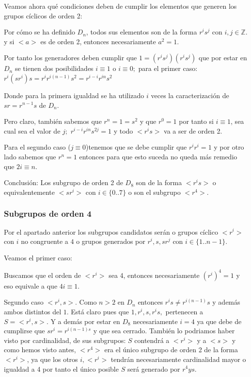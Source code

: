\documentclass[12pt]{article}
\begin{document}
Veamos ahora qué condiciones deben de cumplir los elementos que generen los grupos cíclicos de orden 2: 

Por cómo se ha definido $D_n$, todos sus elementos son de la forma $r^is^j$ con $i,j \in \mathbb Z.$ 
y si $<a>$ es de orden 2, entonces necesariamente $a^2 = 1.$

Por tanto los generadores deben cumplir que $1 = (r^is^j)(r^is^j)$  que por estar en $D_n$ se tienen dos posibilidades 
$i \equiv 1$ o $i \equiv 0;$ para el primer caso:
$r^i(sr^i)s= r^i r^{i(n-1)} s^{2} = r^{i-i} r^{in} s^{2}$

Donde para la primera igualdad se ha utilizado $i$ veces la caracterización de $sr = r^{n-1}s$ de $D_n$.

Pero claro, también sabemos que $r^n = 1 = s^2$ y que $r^0 = 1$ por tanto si $i \equiv 1$, sea cual sea el valor de $j;$
$r^{i-i} r^{in} s^{2j} = 1$ y todo $<r^i s>$ va a ser de orden 2. 

Para el segundo caso ($j \equiv 0$)tenemos que se debe cumplir que $r^i r^i = 1$ y por otro lado sabemos que $r^n = 1$ entonces para que esto
suceda no queda más remedio que $ 2i \equiv n.$

Conclusión: Los subgrupo de orden 2 de $D_8$ son de la forma $<r^i s>$ o equivalentemente $<s r^i>$ con
$i \in \{0..7\}$ o son el subgrupo $<r^4>.$

\subsubsection*{Subgrupos de orden 4}
Por el apartado anterior los subgrupos candidatos serán o grupos cíclico $<r^i>$ con $i$ no congruente a $4$ 
o grupos generados por $r^i, s, sr^j$ con $i \in \{1..n-1\}.$

Veamos el primer caso: 

Buscamos que el orden de $<r^i>$ sea 4, entonces necesariamente $(r^i)^4 = 1$ y eso equivale a que $4i \equiv 1.$

Segundo caso $<r^i, s>.$
Como $n>2$ en $D_n$ entonces $r^i s \neq r^{i(n-1)} s$ y además ambos distintos del $1.$ 
Está claro pues que $1,r^i,s,r^i s,$ pertenecen a $S = <r^i,s>.$ 
Y a demás por estar en $D_8$ necesariamente $i=4$  ya que debe de cumplirse que $s r^i= r^{i(n-1) s}$
y que sea cerrado. 
También lo podriamos haber visto por cardinalidad, de sus subgrupos: 
 $S$ contendrá a $<r^i>$ y a $<s>$ y como hemos visto antes, 
$<r^4>$ era el único subgrupo de orden 2 de la forma $<r^i>$, ya que los otros $i, <r^i>$ tendrán 
necesariamente cardinalidad mayor o igualdad a 4 por tanto  el único posible $S$ será generado por $r^4 y s.$ 
\end{document}

